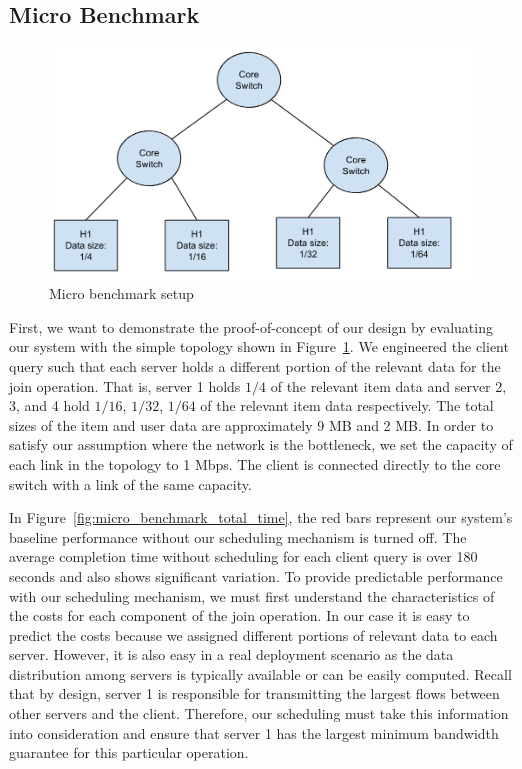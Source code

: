 \documentclass{acm_proc_article-sp}
\begin{document}
\subsection{Micro Benchmark}
\begin{figure}
    \centering
    \includegraphics[scale=2]{figures/Join_micro_benchmark.png}
    \caption{Micro benchmark setup}\label{fig:micro_benchmark}
\end{figure}

First, we want to demonstrate the proof-of-concept of our design by evaluating our system with the simple topology shown in Figure~\ref{fig:micro_benchmark}.
We engineered the client query such that each server holds a different portion of the relevant data for the join operation.
That is, server 1 holds $1/4$ of the relevant item data and server 2, 3, and 4 hold $1/16$, $1/32$, $1/64$ of the relevant item data respectively.
The total sizes of the item and user data are approximately 9 MB and 2 MB\@.
In order to satisfy our assumption where the network is the bottleneck, we set the capacity of each link in the topology to 1 Mbps.
The client is connected directly to the core switch with a link of the same capacity.

In Figure~\ref{fig:micro_benchmark_total_time}, the red bars represent our system's baseline performance without our scheduling mechanism is turned off.
The average completion time without scheduling for each client query is over 180 seconds and also shows significant variation.
To provide predictable performance with our scheduling mechanism, we must first understand the characteristics of the costs for each component of the join operation.
In our case it is easy to predict the costs because we assigned different portions of relevant data to each server.
However, it is also easy in a real deployment scenario as the data distribution among servers is typically available or can be easily computed.
Recall that by design, server 1 is responsible for transmitting the largest flows between other servers and the client.
Therefore, our scheduling must take this information into consideration and ensure that server 1 has the largest minimum bandwidth guarantee for this particular operation.
\end{document}
